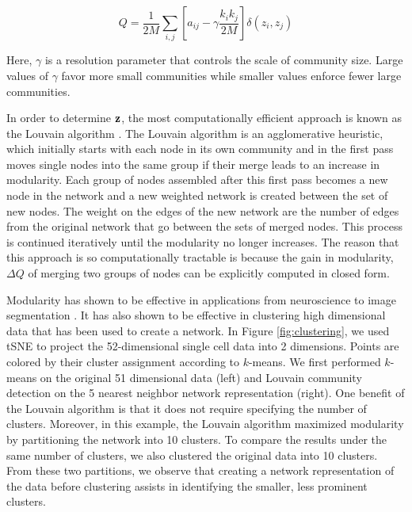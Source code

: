\begin{equation}
Q=\frac{1}{2M}\sum_{i,j}\left[a_{ij}-\gamma \frac{k_{i}k_{j}}{2M}\right]\delta(z_{i},z_{j})
\end{equation} 

Here, $\gamma$ is a resolution parameter \cite{resParam} that controls the scale of community size. Large values of $\gamma$ favor more small communities while smaller values enforce fewer large communities. 

\indent In order to determine ${\bf z}$, the most computationally efficient approach is known as the Louvain algorithm \cite{blondel}. The Louvain algorithm is an agglomerative heuristic, which initially starts with each node in its own community and in the first pass moves single nodes into the same group if their merge leads to an increase in modularity. Each group of nodes assembled after this first pass becomes a new node in the network and a new weighted network is created between the set of new nodes. The weight on the edges of the new network are the number of edges from the original network that go between the sets of merged nodes. This process is continued iteratively until the modularity no longer increases. The reason that this approach is so computationally tractable is because the gain in modularity, $\Delta Q$ of merging two groups of nodes can be explicitly computed in closed form.

\indent Modularity has shown to be effective in applications from neuroscience \cite{hierarchicalmod} to image segmentation \cite{browet}. It has also shown to be effective in clustering high dimensional data that has been used to create a network. In Figure \ref{fig:clustering}, we used tSNE \cite{TwoD} to project the 52-dimensional single cell data into 2 dimensions. Points are colored by their cluster assignment according to $k$-means. We first performed $k$-means on the original 51 dimensional data (left) and Louvain community detection on the 5 nearest neighbor network representation (right). One benefit of the Louvain algorithm is that it does not require specifying the number of clusters. Moreover, in this example, the Louvain algorithm maximized modularity by partitioning the network into 10 clusters. To compare the results under the same number of clusters, we also clustered the original data into 10 clusters. From these two partitions, we observe that creating a network representation of the data before clustering assists in identifying the smaller, less prominent clusters.


